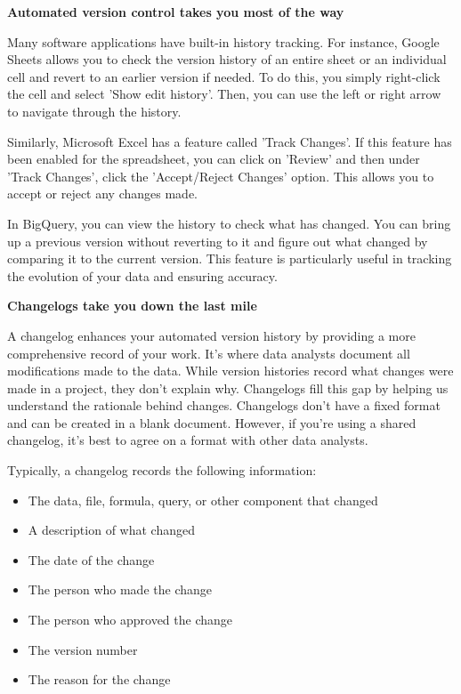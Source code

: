 \documentclass[]{article}
\begin{document}
\textbf{Automated version control takes you most of the way}

Many software applications have built-in history tracking. For instance, Google Sheets allows you to check the version history of an entire sheet or an individual cell and revert to an earlier version if needed. To do this, you simply right-click the cell and select 'Show edit history'. Then, you can use the left or right arrow to navigate through the history.

Similarly, Microsoft Excel has a feature called 'Track Changes'. If this feature has been enabled for the spreadsheet, you can click on 'Review' and then under 'Track Changes', click the 'Accept/Reject Changes' option. This allows you to accept or reject any changes made.

In BigQuery, you can view the history to check what has changed. You can bring up a previous version without reverting to it and figure out what changed by comparing it to the current version. This feature is particularly useful in tracking the evolution of your data and ensuring accuracy.

\textbf{Changelogs take you down the last mile}

A changelog enhances your automated version history by providing a more comprehensive record of your work. It's where data analysts document all modifications made to the data. While version histories record what changes were made in a project, they don't explain why. Changelogs fill this gap by helping us understand the rationale behind changes. Changelogs don't have a fixed format and can be created in a blank document. However, if you're using a shared changelog, it's best to agree on a format with other data analysts.

Typically, a changelog records the following information:

\begin{itemize}
  \item The data, file, formula, query, or other component that changed
  \item A description of what changed
  \item The date of the change
  \item The person who made the change
  \item The person who approved the change
  \item The version number
  \item The reason for the change
\end{itemize}
\end{document}
